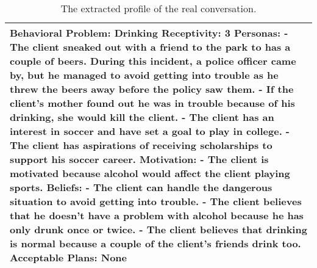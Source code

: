 \begin{table*}[tb]
\begin{tabularx}{\textwidth}{X}
\toprule
Behavioral Problem: Drinking \newline Receptivity: 3 \newline Personas: \newline - The client sneaked out with a friend to the park to has a couple of beers. During this incident, a police officer came by, but he managed to avoid getting into trouble as he threw the beers away before the policy saw them. \newline - If the client's mother found out he was in trouble because of his drinking, she would kill the client. \newline - The client has an interest in soccer and have set a goal to play in college. \newline - The client has aspirations of receiving scholarships to support his soccer career. \newline Motivation: \newline - The client is motivated because alcohol would affect the client playing sports. \newline Beliefs: \newline - The client can handle the dangerous situation to avoid getting into trouble. \newline - The client believes that he doesn't have a problem with alcohol because he has only drunk once or twice. \newline - The client believes that drinking is normal because a couple of the client’s friends drink too. \newline Acceptable Plans: None  \\ \bottomrule
\end{tabularx}
\caption{The extracted profile of the real conversation.}
\label{tab:real profile}
\end{table*}


